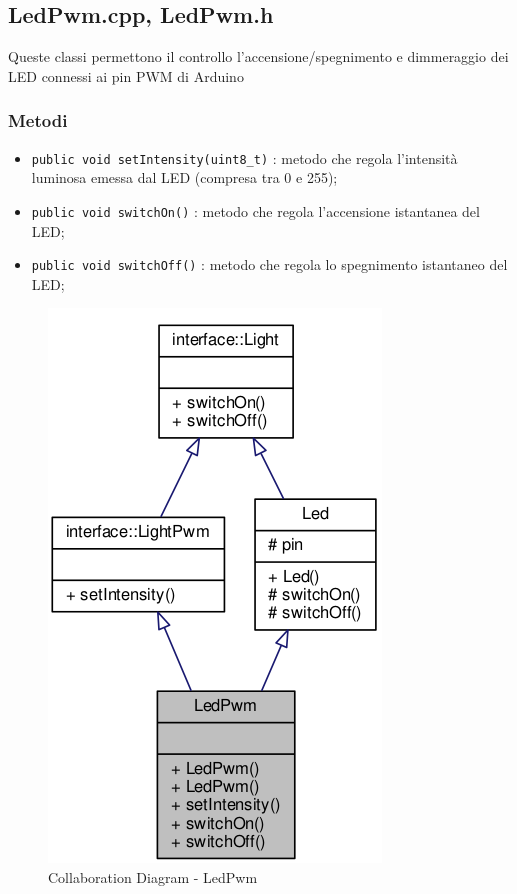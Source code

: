 \newpage
\subsection{LedPwm.cpp, LedPwm.h}
Queste classi permettono il controllo l'accensione/spegnimento e dimmeraggio dei LED connessi ai pin PWM di Arduino
\subsubsection{Metodi}
\begin{itemize}
	\item \texttt{public void setIntensity(uint8\_t)} : metodo che regola l'intensità luminosa emessa dal LED (compresa tra 0 e 255);
	\item \texttt{public void switchOn()} : metodo che regola l'accensione istantanea del LED;
	\item \texttt{public void switchOff()} : metodo che regola lo spegnimento istantaneo del LED;
\end{itemize}
\begin{figure}[!ht]
	\centering
	\includegraphics[scale=.4]{img/UML/CollaborationDiagram/LedPwm.png}
	\caption{Collaboration Diagram - LedPwm}
\end{figure}
